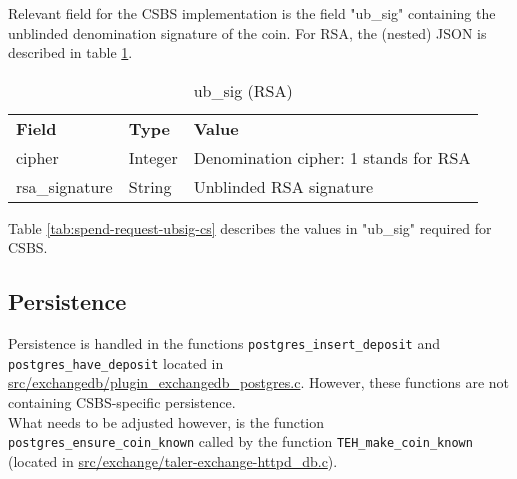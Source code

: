Relevant field for the \gls{CSBS} implementation is the field "ub\_sig" containing the unblinded denomination signature of the coin.
For RSA, the (nested) \ac{JSON} is described in table \ref{tab:spend-request-ubsig-rsa}.
\begin{table}[ht]
  \centering
  \setupBfhTabular
  \begin{tabular}{lll}
      \rowcolor{BFH-tablehead}
      \textbf{Field} & \textbf{Type} & \textbf{Value} \\
      cipher & Integer & Denomination cipher: 1 stands for RSA \\
      rsa\_signature & String & Unblinded RSA signature \\
  \end{tabular}
  \caption{ub\_sig (RSA)}
  \label{tab:spend-request-ubsig-rsa}
\end{table}

Table \ref{tab:spend-request-ubsig-cs} describes the values in "ub\_sig" required for \gls{CSBS}.
\begin{table}[ht]
  \centering
\end{table}


\subsection{Persistence}
Persistence is handled in the functions \texttt{postgres\_insert\_deposit} and\\ \texttt{postgres\_have\_deposit} located in \url{src/exchangedb/plugin_exchangedb_postgres.c}.
However, these functions are not containing \gls{CSBS}-specific persistence.
\\What needs to be adjusted however, is the function \texttt{postgres\_ensure\_coin\_known} called by the function \texttt{TEH\_make\_coin\_known} (located in \url{src/exchange/taler-exchange-httpd_db.c}).


